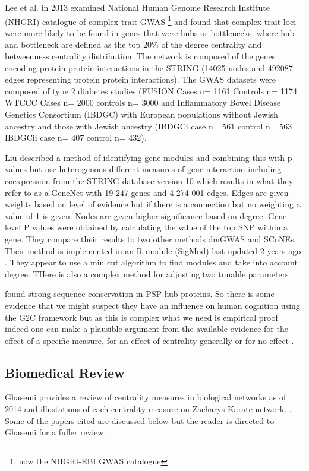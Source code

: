 Lee et al. \cite{lee2013network} in 2013 examined National Human Genome Research Institute (NHGRI)  catalogue of complex trait GWAS \footnote{now the NHGRI-EBI GWAS catalogue} and found that complex trait loci were more likely to be found in genes that were hubs or bottlenecks, where hub and bottleneck are defined as the top 20\% of the degree centrality and betweenness centrality distribution.  The network is composed of the genes encoding protein protein interactions in the STRING (14025 nodes and 492087 edges representing protein protein interactions). The GWAS datasets were composed of type 2 diabetes studies (FUSION  Cases n=	1161 Controls n=	1174 
WTCCC Cases n=	2000 controls n=	3000  and Inflammatory Bowel Disease Genetics Consortium (IBDGC) with European populations without Jewish ancestry and those with Jewish ancestry (IBDGCi case n=	561 control n=	563 IBDGCii case n= 	407 control n=	432).  

Liu \cite{liu2017sigmod} described a method of identifying gene modules and combining this with p values but use heterogenous different measures of gene interaction including coexpression from the STRING database version 10 which results in what they refer to as a GeneNet  with 19 247 genes and 4 274 001 edges. Edges are given weights based on level of evidence but if there is a connection but no weighting a value of 1 is given. Nodes are given higher significance based on degree.  Gene level P values were obtained by calculating the value of the top SNP within a gene. They compare their results to two other methods dmGWAS and SCoNEs. Their method is implemented in an R module (SigMod) last updated 2 years ago . They appear to use a min cut algorithm to find modules and take into account degree. THere is also a complex method for adjusting two tunable parameters 



\cite{bayes2011characterization} found strong sequence conservation in PSP hub proteins. So there is some evidence that we might suspect they have an influence on human cognition using the G2C framework but as this is complex what we need is empirical proof indeed one can make a plausible argument from the available evidence for the effect of a specific measure, for an effect of centrality generally or for no effect .  


\subsection{ Biomedical Review}
Ghasemi provides a review of centrality measures in biological networks as of 2014 and illustations of each centrality measure on Zacharys Karate network.
\cite{ghasemi2014centrality}. Some of the papers cited are discussed below but the reader is directed to Ghasemi \cite{ghasemi2014centrality} for a fuller review. 

